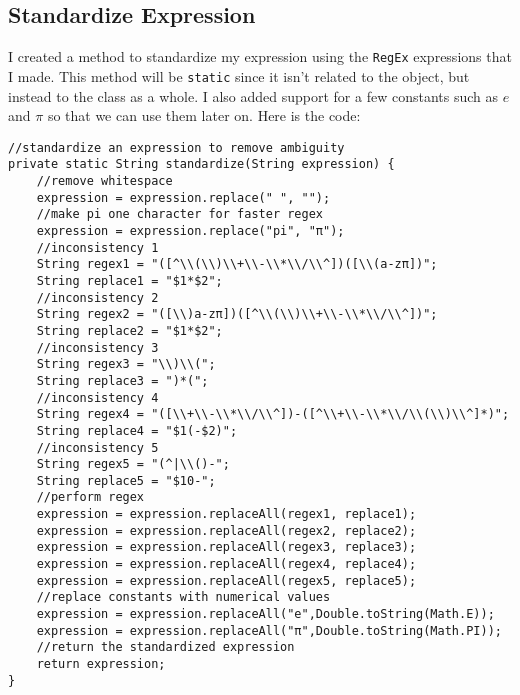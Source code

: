 \documentclass[../../../../main.tex]{subfiles}
\begin{document}
\subsection{Standardize Expression}
I created a method to standardize my expression using the \texttt{RegEx} expressions that I made. This method will be \texttt{static} since it isn't related to the object, but instead to the class as a whole. I also added support for a few constants such as $e$ and $\pi$ so that we can use them later on. Here is the code:
\begin{verbatim}
//standardize an expression to remove ambiguity
private static String standardize(String expression) {
	//remove whitespace
	expression = expression.replace(" ", "");
	//make pi one character for faster regex
	expression = expression.replace("pi", "π");
	//inconsistency 1
	String regex1 = "([^\\(\\)\\+\\-\\*\\/\\^])([\\(a-zπ])";
	String replace1 = "$1*$2";
	//inconsistency 2
	String regex2 = "([\\)a-zπ])([^\\(\\)\\+\\-\\*\\/\\^])";
	String replace2 = "$1*$2";
	//inconsistency 3
	String regex3 = "\\)\\(";
	String replace3 = ")*(";
	//inconsistency 4
	String regex4 = "([\\+\\-\\*\\/\\^])-([^\\+\\-\\*\\/\\(\\)\\^]*)";
	String replace4 = "$1(-$2)";
	//inconsistency 5
	String regex5 = "(^|\\()-";
	String replace5 = "$10-";
	//perform regex
	expression = expression.replaceAll(regex1, replace1);
	expression = expression.replaceAll(regex2, replace2);
	expression = expression.replaceAll(regex3, replace3);
	expression = expression.replaceAll(regex4, replace4);
	expression = expression.replaceAll(regex5, replace5);
	//replace constants with numerical values
	expression = expression.replaceAll("e",Double.toString(Math.E));
	expression = expression.replaceAll("π",Double.toString(Math.PI));
	//return the standardized expression
	return expression;
}
\end{verbatim}
\end{document}
